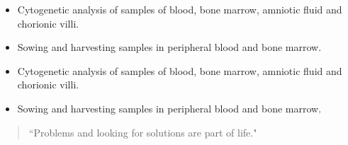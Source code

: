 \documentclass[10pt,a4paper,ragged2e,]{altacv}
\begin{document}
\divider

\begin{itemize}
\item Cytogenetic analysis of samples of blood, bone marrow, amniotic fluid and chorionic villi.
\item Sowing and harvesting samples in peripheral blood and bone marrow.
\end{itemize}

\divider


\begin{itemize}
\item Cytogenetic analysis of samples of blood, bone marrow, amniotic fluid and chorionic villi.
\item Sowing and harvesting samples in peripheral blood and bone marrow.
\end{itemize}





\begin{quote}
``Problems and looking for solutions are part of life."
\end{quote}



\divider

\end{document}
